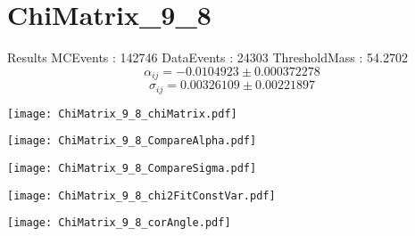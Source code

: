 \documentclass[a4paper,12pt]{article}
\begin{document}
\section{ChiMatrix\_9\_8}
\begin{minipage}{0.49\linewidth} Results \newline
MCEvents : 142746\newline
DataEvents : 24303 \newline
ThresholdMass : 54.2702\\
$$\alpha_{ij} = -0.0104923\pm 0.000372278$$
$$\sigma_{ij} = 0.00326109\pm 0.00221897$$
\end{minipage}\hfill
\begin{minipage}{0.49\linewidth} 
\texttt{[image: ChiMatrix\_9\_8\_chiMatrix.pdf]}\\
\end{minipage}
\hfill
\begin{minipage}{0.49\linewidth} 
\texttt{[image: ChiMatrix\_9\_8\_CompareAlpha.pdf]}\\
\end{minipage}
\hfill
\begin{minipage}{0.49\linewidth} 
\texttt{[image: ChiMatrix\_9\_8\_CompareSigma.pdf]}\\
\end{minipage}
\begin{minipage}{0.49\linewidth} 
\texttt{[image: ChiMatrix\_9\_8\_chi2FitConstVar.pdf]}\\
\end{minipage}
\hfill
\begin{minipage}{0.49\linewidth} 
\texttt{[image: ChiMatrix\_9\_8\_corAngle.pdf]}\\
\end{minipage}
\end{document}

